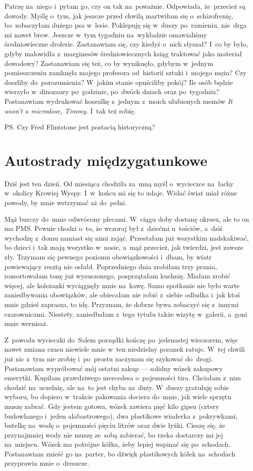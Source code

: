 \documentclass[9pt, a5paper]{memoir}
\begin{document}
Patrzę na~niego i~pytam go, czy on tak na~poważnie. Odpowiada, że~przecież są dowody. Myślę o~tym, jak jeszcze przed chwilą martwiłam się o~schizofrenię, bo~zobaczyłam dużego psa w~lesie. Poklepuję się w~duszy po~ramieniu, nie~drga mi nawet brew. Jeszcze w~tym tygodniu na~wykładzie omawialiśmy średniowieczne drolerie. Zastanawiam się, czy kiedyś o~nich słyszał? I~co by było, gdyby malowidła z~marginesów średniowiecznych ksiąg traktować jako materiał dowodowy? Zastanawiam się też, co by wyniknęło, gdybym w~jednym pomieszczeniu zamknęła mojego profesora od~historii sztuki i~mojego męża? Czy doszliby do~porozumienia? W~jakim stanie opuściliby pokój? Ile osób będzie wierzyło w~dinozaury po~godzinie, po~dwóch dniach oraz po~tygodniu? Postanawiam wydrukować koszulkę z~jednym z~moich ulubionych memów \textit{It wasn't a microdose, Timmy}. I~tak też robię.

\bigskip
\noindent
PS. Czy Fred Flintstone jest postacią historyczną?

\newpage
\section{Autostrady międzygatunkowe}
Dziś jest ten dzień. Od miesiąca chodziła za~mną myśl o~wycieczce na~łachy w~okolicy Krowiej Wyspy. I~w~końcu mi się to udaje. Widać świat miał różne powody, by mnie wstrzymać aż do~pełni.

Mąż burczy do~mnie odwrócony plecami. W~ciągu doby dostanę okresu, ale to on ma PMS. Pewnie chodzi o~to, że wczoraj był z~dziećmi u~teściów, a~dziś wychodzę z~domu zamiast się nimi zająć. Przestałam już wszystkim nadskakiwać, bo dzieci i~tak mają wszystko w~nosie, a~mąż przecież, jak twierdzi, jest zawsze zły. Trzymam się pewnego poziomu obowiązkowości i~dbam, by wiatr powiewający resztą nie osłabł. Poprzedniego dnia zrobiłam trzy prania, rozsortowałam tonę już wysuszonego, posprzątałam kuchnię. Miałam zrobić więcej, ale koleżanki wyciągnęły mnie na~kawę. Samo spotkanie nie było warte zaniedbywania obowiązków, ale obiecałam nie robić z~siebie odludka i~jak ktoś mnie gdzieś zaprasza, to idę. Przyznam, że dobrze bywa zobaczyć się z~innymi czarownicami. Niestety, zaniedbałam z~tego tytułu także wizytę w~galerii, a~goni mnie wernisaż.

Z~powodu wycieczki do~Salem porządki kończę po~jedenastej wieczorem, więc nawet zmiana czasu niewiele mnie w~ten niedzielny poranek ratuje. W~tej chwili już nic z~tym nie zrobię i~po~prostu zaczynam się szykować do~drogi. Postanawiam wypróbować mój ostatni zakup --- solidny wózek zakupowy emerytki. Kupiłam prawdziwego mercedesa o~pojemności tira. Chciałam z~nim chodzić na~uczelnię, ale na~to jest chyba za~duży. W~duszy gratuluję sobie wyboru, bo dopiero w~trakcie pakowania dociera do~mnie, jak wiele sprzętu muszę zabrać. Gdy jestem gotowa, wózek zawiera pięć kilo gipsu (cztery budowlanego i~jeden alabastrowego), dwa plastikowe wiaderka z~pokrywkami, butelkę na~wodę o~pojemności pięciu litrów oraz dwie łyżki. Cieszę się, że przynajmniej wody nie muszę ze~sobą zabierać, bo rzeka dostarczy mi jej na~miejscu. Wózek ma potrójne kółka, żeby lepiej wspinać się po~schodach. Postanawiam znieść go na~parter, bo dźwięk plastikowych kółek na~schodach przyprawia mnie o~dreszcze.
\end{document}
